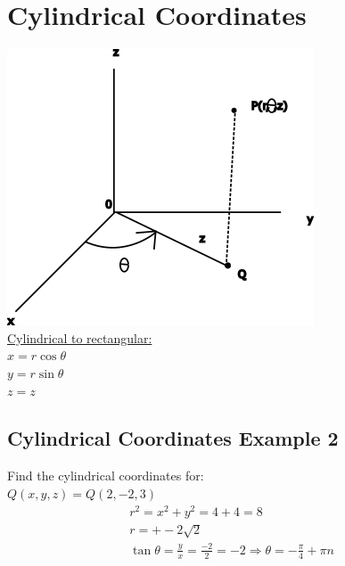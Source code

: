 \documentclass[12pt]{article}
\begin{document}
\section{Cylindrical Coordinates}

\includegraphics{cylindricalcoordinate}\\%
\underline{Cylindrical to rectangular:}\\%
$x=r\cos\theta$\\%
$y=r\sin\theta$\\%
$z=z$

\subsection{Cylindrical Coordinates Example 2}
Find the cylindrical coordinates for:\\%
$Q(x,y,z) = Q(2,-2,3)$
\begin{align}
	r^2=x^2+y^2=4+4=8\\%
	r=+-2\sqrt{2}\\%
	\tan\theta=\frac{y}{x}=\frac{-2}{2}=-2 \Rightarrow \theta =- \frac{\pi}{4}+\pi n
\end{align}
\end{document}
